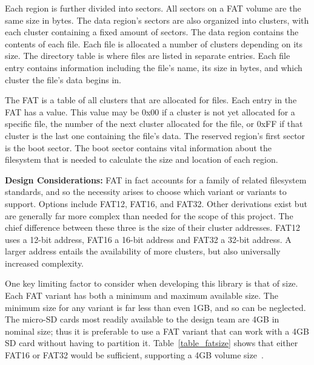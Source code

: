 Each region is further divided into sectors. All sectors on a FAT volume are the same size in bytes. The data region's sectors are also organized into clusters, with each cluster containing a fixed amount of sectors. The data region contains the contents of each file. Each file is allocated a number of clusters depending on its size. The directory table is where files are listed in separate entries. Each file entry contains information including the file's name, its size in bytes, and which cluster the file's data begins in. 

The FAT is a table of all clusters that are allocated for files. Each entry in the FAT has a value. This value may be 0x00 if a cluster is not yet allocated for a specific file, the number of the next cluster allocated for the file, or 0xFF if that cluster is the last one containing the file's data. The reserved region's first sector is the boot sector. The boot sector contains vital information about the filesystem that is needed to calculate the size and location of each region.




\textbf{Design Considerations:} FAT in fact accounts for a family of related filesystem standards, and so the necessity arises to choose which variant or variants to support. Options include FAT12, FAT16, and FAT32. Other derivations exist but are generally far more complex than needed for the scope of this project.
The chief difference between these three is the size of their cluster addresses. FAT12 uses a 12-bit address, FAT16 a 16-bit address and FAT32 a 32-bit address. A larger address entails the availability of more clusters, but also universally increased complexity.
\par

One key limiting factor to consider when developing this library is that of size. Each FAT variant has both a minimum and maximum available size. The minimum size for any variant is far less than even 1GB, and so can be neglected. The micro-SD cards most readily available to the design team are 4GB in nominal size; thus it is preferable to use a FAT variant that can work with a 4GB SD card without having to partition it. Table~\ref{table_fatsize} shows that either FAT16 or FAT32 would be sufficient, supporting a 4GB volume size~\cite{src_FAT-filesizes}.

